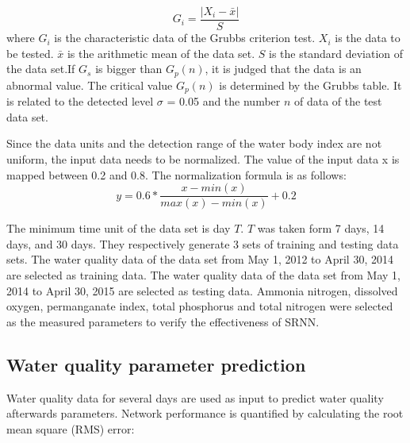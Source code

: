 \documentclass[runningheads]{llncs}
\begin{document}
\begin{equation}
G_i=\frac{\left|X_i- \bar x \right|}{S}   
\end{equation}
where $G_i$ is the characteristic data of the Grubbs criterion test.
$X_i$ is the data to be tested. $\bar x$ is the arithmetic mean of the data set. 
$S$ is the standard deviation of the data set.If $G_s$ is bigger than $G_p (n)$, 
it is judged that the data is an abnormal value. 
The critical value $G_p (n)$ is determined by the Grubbs table. 
It is related to the detected level $\sigma$ = 0.05 
and the number $n$ of data of the test data set.

Since the data units and the detection range of the water body index are not 
uniform, the input data needs to be normalized. The value of the 
input data x is mapped between 0.2 and 0.8. The normalization formula is as follows:
\begin{equation}
y=0.6*\frac{x-min(x)}{max(x)-min(x)}+0.2  
\end{equation}

The minimum time unit of the data set is day $T$. $T$ was taken form 7 days, 14 days, 
and 30 days. They respectively generate 3 sets of training and 
testing data sets. The water quality data of the data set from 
May 1, 2012 to April 30, 2014 are selected as training data. 
The water quality data of the data set from May 1, 
2014 to April 30, 2015 are selected as testing data.
Ammonia nitrogen, dissolved oxygen, permanganate index, 
total phosphorus and total nitrogen were selected as the 
measured parameters to verify the effectiveness of SRNN.

\subsection{Water quality parameter prediction}
Water quality data for several days are used as input to 
predict water quality afterwards parameters. Network performance 
is quantified by calculating the root mean square (RMS) error:
\end{document}
